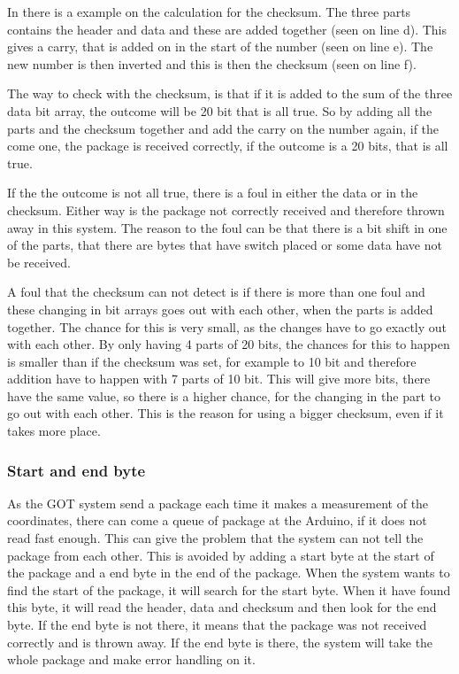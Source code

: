 In  there is a example on the calculation for the checksum. The three parts contains the header and data and these are added together (seen on line d). This gives a carry, that is added on in the start of the number (seen on line e). The new number is then inverted and this is then the checksum (seen on line f).

The way to check with the checksum, is that if it is added to the sum of the three data bit array, the outcome will be 20 bit that is all true. So by adding all the parts and the checksum together and add the carry on the number again, if the come one, the package is received correctly, if the outcome is a 20 bits, that is all true.

If the the outcome is not all true, there is a foul in either the data or in the checksum. Either way is the package not correctly received and therefore thrown away in this system. The reason to the foul can be that there is a bit shift in one of the parts, that there are bytes that have switch placed or some data have not be received. 

A foul that the checksum can not detect is if there is more than one foul and these changing in bit arrays goes out with each other, when the parts is added together. The chance for this is very small, as the changes have to go exactly out with each other. By only having 4 parts of 20 bits, the chances for this to happen is smaller than if the checksum was set, for example to 10 bit and therefore addition have to happen with 7 parts of 10 bit. This will give more bits, there have the same value, so there is a higher chance, for the changing in the part to go out with each other. This is the reason for using a bigger checksum, even if it takes more place.

\subsubsection{Start and end byte}
As the GOT system send a package each time it makes a measurement of the coordinates, there can come a queue of package at the Arduino, if it does not read fast enough. This can give the problem that the system can not tell the package from each other. This is avoided by adding a start byte at the start of the package and a end byte in the end of the package. When the system wants to find the start of the package, it will search for the start byte. When it have found this byte, it will read the header, data and checksum and then look for the end byte. If the end byte is not there, it means that the package was not received correctly and is thrown away. If the end byte is there, the system will take the whole package and make error handling on it.

